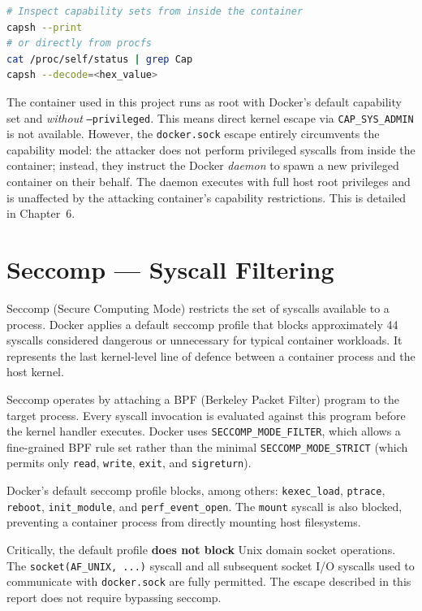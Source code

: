 \begin{lstlisting}[language=bash]
# Inspect capability sets from inside the container
capsh --print
# or directly from procfs
cat /proc/self/status | grep Cap
capsh --decode=<hex_value>
\end{lstlisting}

The container used in this project runs as root with Docker's default capability set
and \textit{without} \texttt{--privileged}. This means direct kernel escape via
\texttt{CAP\_SYS\_ADMIN} is not available. However, the \texttt{docker.sock} escape
entirely circumvents the capability model: the attacker does not perform privileged
syscalls from inside the container; instead, they instruct the Docker \textit{daemon}
to spawn a new privileged container on their behalf. The daemon executes with full
host root privileges and is unaffected by the attacking container's capability
restrictions. This is detailed in Chapter~6.


\section{Seccomp --- Syscall Filtering}
\label{sec:seccomp}

Seccomp (Secure Computing Mode) restricts the set of syscalls available to a process.
Docker applies a default seccomp profile that blocks approximately 44 syscalls
considered dangerous or unnecessary for typical container workloads. It represents the
last kernel-level line of defence between a container process and the host kernel.

Seccomp operates by attaching a BPF (Berkeley Packet Filter) program to the target
process. Every syscall invocation is evaluated against this program before the kernel
handler executes. Docker uses \texttt{SECCOMP\_MODE\_FILTER}, which allows a
fine-grained BPF rule set rather than the minimal
\texttt{SECCOMP\_MODE\_STRICT} (which permits only \texttt{read},
\texttt{write}, \texttt{exit}, and \texttt{sigreturn}).

Docker's default seccomp profile blocks, among others: \texttt{kexec\_load},
\texttt{ptrace}, \texttt{reboot}, \texttt{init\_module}, and
\texttt{perf\_event\_open}. The \texttt{mount} syscall is also blocked, preventing a
container process from directly mounting host filesystems.

Critically, the default profile \textbf{does not block} Unix domain socket
operations. The \texttt{socket(AF\_UNIX, ...)} syscall and all subsequent socket I/O
syscalls used to communicate with \texttt{docker.sock} are fully permitted. The
escape described in this report does not require bypassing seccomp.

